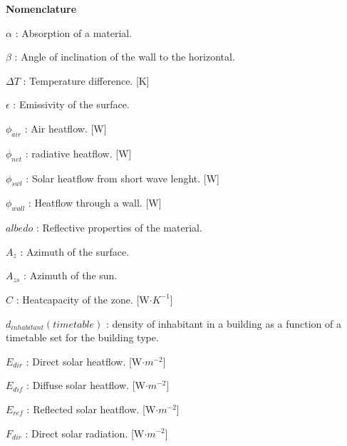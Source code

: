 \documentclass[runningheads]{llncs}
\begin{document}
\begin{credits}
\end{credits}

\textbf{Nomenclature}

$\alpha$ : Absorption of a material.
  
$\beta$ : Angle of inclination of the wall to the horizontal.
  
$\Delta T$ : Temperature difference. [K]
  
$\epsilon$ : Emissivity of the surface.
  
$\phi_{air}$ : Air heatflow. [W]
  
$\phi_{net}$ : radiative heatflow. [W]
  
$\phi_{swl}$ : Solar heatflow from short wave lenght. [W]
  
$\phi_{wall}$ : Heatflow through a wall. [W]
  
$albedo$ : Reflective properties of the material.
  
$A_z$ : Azimuth of the surface.
  
$A_{zs}$ : Azimuth of the sun.
  
$C$ : Heatcapacity of the zone. [W$\cdot K^{-1}$]

$d_{inhabitant}(timetable)$ : density of inhabitant in a building as a function of a timetable set for the building type.
  
$E_{dir}$ : Direct solar heatflow. [W$\cdot m^{-2}$]
  
$E_{dif}$ : Diffuse solar heatflow. [W$\cdot m^{-2}$]
  
$E_{ref}$ : Reflected solar heatflow. [W$\cdot m^{-2}$]
  
$F_{dir}$ : Direct solar radiation. [W$\cdot m^{-2}$]
  
\end{document}
